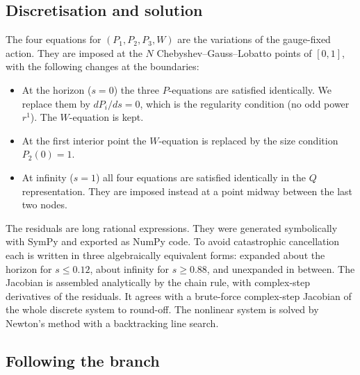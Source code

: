 \documentclass[11pt,a4paper]{article}
\begin{document}
\subsection{Discretisation and solution}

The four equations for $(P_1,P_2,P_3,W)$ are the variations of the gauge-fixed
action. They are imposed at the $N$ Chebyshev--Gauss--Lobatto points of
$[0,1]$, with the following changes at the boundaries:
\begin{itemize}
\item At the horizon ($s=0$) the three $P$-equations are satisfied identically.
We replace them by $dP_i/ds=0$, which is the regularity condition (no odd power
$r^1$). The $W$-equation is kept.
\item At the first interior point the $W$-equation is replaced by the size
condition $P_2(0)=1$.
\item At infinity ($s=1$) all four equations are satisfied identically in the
$Q$ representation. They are imposed instead at a point midway between the last
two nodes.
\end{itemize}
The residuals are long rational expressions. They were generated symbolically
with SymPy and exported as NumPy code. To avoid catastrophic cancellation each is
written in three algebraically equivalent forms: expanded about the horizon for
$s\le0.12$, about infinity for $s\ge0.88$, and unexpanded in between. The
Jacobian is assembled analytically by the chain rule, with complex-step
derivatives of the residuals. It agrees with a brute-force complex-step Jacobian
of the whole discrete system to round-off. The nonlinear system is solved by
Newton's method with a backtracking line search.

\subsection{Following the branch}
\end{document}
